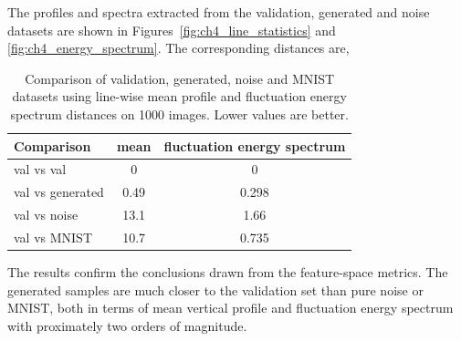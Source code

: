 The profiles and spectra extracted from the validation, generated and noise datasets are shown in Figures~\ref{fig:ch4_line_statistics} and
\ref{fig:ch4_energy_spectrum}. The corresponding distances are,

\begin{table}[H]
    \centering
    \begin{tabular}{lcc}
        \hline
        Comparison & mean & fluctuation energy spectrum \\
        \hline
        val vs val & 0 & 0 \\
        val vs generated & 0.49 & 0.298 \\
        val vs noise & 13.1 & 1.66 \\
        val vs MNIST & 10.7 & 0.735 \\
        \hline
    \end{tabular}
    \caption{Comparison of validation, generated, noise and MNIST datasets using line-wise mean profile and fluctuation energy spectrum distances on 1000 images. Lower values are better.}
    \label{tab:line_profile_spectrum_baseline}
\end{table}

The results confirm the conclusions drawn from the feature-space metrics. The generated samples are much closer to the validation set than pure noise or MNIST, both in terms of mean vertical profile and fluctuation energy spectrum with proximately two orders of magnitude. 